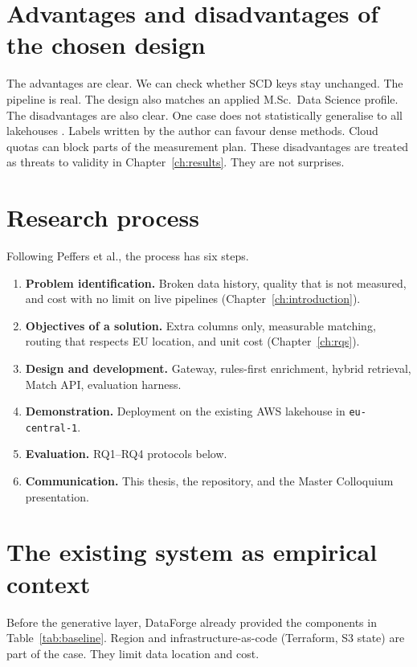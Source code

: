 \section{Advantages and disadvantages of the chosen design}
\label{sec:method-tradeoffs}

The advantages are clear. We can check whether SCD keys stay unchanged. The pipeline is real. The design also matches an applied M.Sc.\ Data Science profile. The disadvantages are also clear. One case does not statistically generalise to all lakehouses . Labels written by the author can favour dense methods. Cloud quotas can block parts of the measurement plan. These disadvantages are treated as threats to validity in Chapter~\ref{ch:results}. They are not surprises.

\section{Research process}
\label{sec:process}

Following Peffers et al., the process has six steps.

\begin{enumerate}
  \item \textbf{Problem identification.} Broken data history, quality that is not measured, and cost with no limit on live pipelines (Chapter~\ref{ch:introduction}).
  \item \textbf{Objectives of a solution.} Extra columns only, measurable matching, routing that respects EU location, and unit cost (Chapter~\ref{ch:rqs}).
  \item \textbf{Design and development.} Gateway, rules-first enrichment, hybrid retrieval, Match API, evaluation harness.
  \item \textbf{Demonstration.} Deployment on the existing AWS lakehouse in \texttt{eu-central-1}.
  \item \textbf{Evaluation.} RQ1--RQ4 protocols below.
  \item \textbf{Communication.} This thesis, the repository, and the Master Colloquium presentation.
\end{enumerate}

\section{The existing system as empirical context}
\label{sec:context}

Before the generative layer, DataForge already provided the components in Table~\ref{tab:baseline}. Region and infrastructure-as-code (Terraform, S3 state) are part of the case. They limit data location and cost.

